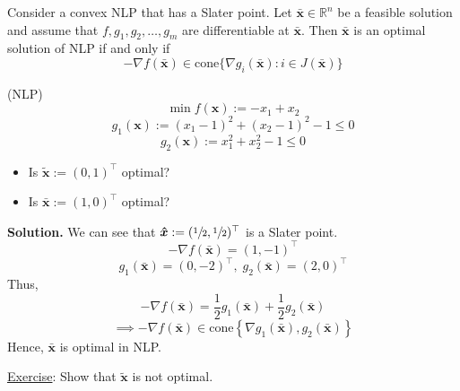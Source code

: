 \begin{thmbox}
    \begin{theorem}
        Consider a convex NLP that has a Slater point. Let $ \bm{\bar{x}}\in \mathbb{R}^{n} $
        be a feasible solution and assume that $ f,g_1,g_2,\ldots ,g_m $ are differentiable
        at $ \bm{\bar{x}} $. Then $ \bm{\bar{x}} $ is an optimal solution of NLP
        if and only if
        \[ -\nabla f(\bm{\bar{x}})\in\text{cone} \{\nabla g_i(\bm{\bar{x}}):i\in J(\bm{\bar{x}})\} \]
    \end{theorem}
\end{thmbox}

\begin{exbox}
    \begin{example}
        (NLP)
        \[ \min f(\bm{x}):=-x_1+x_2 \]
        \[ g_1(\bm{x}):=(x_1-1)^2+(x_2-1)^2-1\leqslant 0 \]
        \[ g_2(\bm{x}):=x_1^2+x_2^2-1\leqslant 0 \]
        \begin{itemize}
            \item Is $ \bm{\tilde{x}}:=(0,1)^\top $ optimal?
            \item Is $ \bm{\bar{x}}:=(1,0)^\top $ optimal?
        \end{itemize}
        \textbf{Solution.} We can see that $ \bm{\hat{x}}:=(\sfrac{1}{2},\sfrac{1}{2})^\top $
        is a Slater point.
        \[ -\nabla f(\bm{\bar{x}}) = (1,-1)^\top \]
        \[ g_1(\bm{\bar{x}})=(0,-2)^\top,\;g_2(\bm{\bar{x}})=(2,0)^\top \]
        Thus,
        \[ -\nabla f(\bm{\bar{x}})=\frac{1}{2} g_1(\bm{\bar{x}})+\frac{1}{2}g_2(\bm{\bar{x}})  \]
        \[ \implies  -\nabla f(\bm{\bar{x}})\in\text{cone} \left\{\nabla g_1(\bm{\bar{x}}),g_2(\bm{\bar{x}})\right\}  \]
        Hence, $ \bm{\bar{x}} $ is optimal in NLP\@.

        \underline{Exercise}: Show that $ \bm{\tilde{x}} $ is not optimal.
    \end{example}
\end{exbox}
